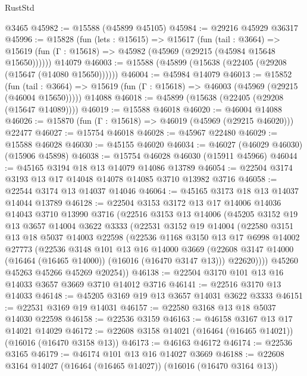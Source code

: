 \begin{lexlean}{RustStd}
\begin{coremodule}
    @3465
@45982 := @15588 (@45899 @45105)
@45984 := @29216 @45929 @36317
@45996 := @15828
    (fun (lets : @15615) =>
    @15617
      (fun (tail : @3664) =>
      @15619 (fun (Γ : @15618) => @45982 (@45969 (@29215 (@45984 @15648 @15650))))))
    @14079
@46003 := @15588 (@45899 (@15638 (@22405 (@29208 (@15647 (@14080 @15650))))))
@46004 := @45984 @14079
@46013 := @15852
    (fun (tail : @3664) => @15619 (fun (Γ : @15618) => @46003 (@45969 (@29215 (@46004 @15650)))))
    @14088
@46018 := @45899 (@15638 (@22405 (@29208 (@15647 @14089))))
@46019 := @15588 @46018
@46020 := @46004 @14088
@46026 := @15870 (fun (Γ : @15618) => @46019 (@45969 (@29215 @46020))) @22477
@46027 := @15754 @46018
@46028 := @45967 @22480
@46029 := @15588 @46028
@46030 := @45155 @46020
@46034 := @46027 (@46029 @46030) (@15906 @45898)
@46038 := @15754 @46028 @46030 (@15911 @45966)
@46044 := @45165 @3194 @18 @13 @14079 @14086 @13789
@46054 := @22504 @3174 @3193 @13 @17 @14048 @14078 @14085 @3710 @13982 @3716
@46058 := @22544 @3174 @13 @14037 @14046
@46064 := @45165 @3173 @18 @13 @14037 @14044 @13789
@46128 := @22504
    @3153
    @3172
    @13
    @17
    @14006
    @14036
    @14043
    @3710
    @13990
    @3716
    (@22516
      @3153
      @13
      @14006
      (@45205
        @3152
        @19
        @13
        @3657
        @14004
        @3622
        @3333
        (@22531
          @3152
          @19
          @14004
          (@22580
            @3151
            @13
            @18
            @5037
            @14003
            @22598
            (@22536
              @1168
              @3150
              @13
              @17
              @6998
              @14002
              @27773
              (@22536
                @3148
                @101
                @13
                @16
                @14000
                @3669
                (@22608 @3147 @14000 (@16464 (@16465 @14000)) (@16016 (@16470 @3147 @13)))
                @22620))))
        @45260
        @45263
        @45266
        @45269
        @20254))
@46138 := @22504 @3170 @101 @13 @16 @14033 @3657 @3669 @3710 @14012 @3716
@46141 := @22516 @3170 @13 @14033
@46148 := @45205 @3169 @19 @13 @3657 @14031 @3622 @3333
@46151 := @22531 @3169 @19 @14031
@46157 := @22580 @3168 @13 @18 @5037 @14030 @22598
@46158 := @22536 @3159
@46163 := @46158 @3167 @13 @17 @14021 @14029
@46172 := @22608 @3158 @14021 (@16464 (@16465 @14021)) (@16016 (@16470 @3158 @13))
@46173 := @46163 @46172
@46174 := @22536 @3165
@46179 := @46174 @101 @13 @16 @14027 @3669
@46188 := @22608 @3164 @14027 (@16464 (@16465 @14027)) (@16016 (@16470 @3164 @13))

\end{coremodule}
\end{lexlean}
